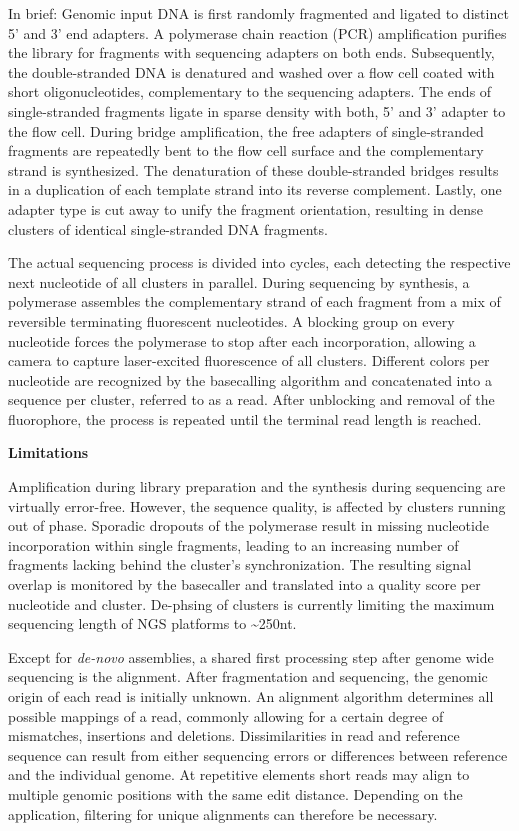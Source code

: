 In brief: Genomic input DNA is first randomly fragmented and ligated to distinct 5' and 3' end adapters.
A polymerase chain reaction (PCR) amplification purifies the library for fragments with sequencing adapters on both ends.
Subsequently, the double-stranded DNA is denatured and washed over a flow cell coated with short oligonucleotides, complementary to the sequencing adapters.
The ends of single-stranded fragments ligate in sparse density with both, 5' and 3' adapter to the flow cell.
During bridge amplification, the free adapters of single-stranded fragments are repeatedly bent to the flow cell surface and the complementary strand is synthesized. 
The denaturation of these double-stranded bridges results in a duplication of each template strand into its reverse complement.
Lastly, one adapter type is cut away to unify the fragment orientation, resulting in dense clusters of identical single-stranded DNA fragments.

The actual sequencing process is divided into cycles, each detecting the respective next nucleotide of all clusters in parallel.
During sequencing by synthesis, a polymerase assembles the complementary strand of each fragment from a mix of reversible terminating fluorescent nucleotides.
A blocking group on every nucleotide forces the polymerase to stop after each incorporation, allowing a camera to capture laser-excited fluorescence of all clusters.
Different colors per nucleotide are recognized by the basecalling algorithm and concatenated into a sequence per cluster, referred to as a read.
After unblocking and removal of the fluorophore, the process is repeated until the terminal read length is reached.

\textbf{Limitations}

Amplification during library preparation and the synthesis during sequencing are virtually error-free.
However, the sequence quality, is affected by clusters running out of phase. 
Sporadic dropouts of the polymerase result in missing nucleotide incorporation within single fragments, leading to an increasing number of fragments lacking behind the cluster's synchronization.
The resulting signal overlap is monitored by the basecaller and translated into a quality score per nucleotide and cluster.
De-phsing of clusters is currently limiting the maximum sequencing length of NGS platforms to \textasciitilde250nt.

Except for \textit{de-novo} assemblies, a shared first processing step after genome wide sequencing is the alignment.
After fragmentation and sequencing, the genomic origin of each read is initially unknown.
An alignment algorithm determines all possible mappings of a read, commonly allowing for a certain degree of mismatches, insertions and deletions.
Dissimilarities in read and reference sequence can result from either sequencing errors or differences between reference and the individual genome.
At repetitive elements short reads may align to multiple genomic positions with the same edit distance.
Depending on the application, filtering for unique alignments can therefore be necessary.

